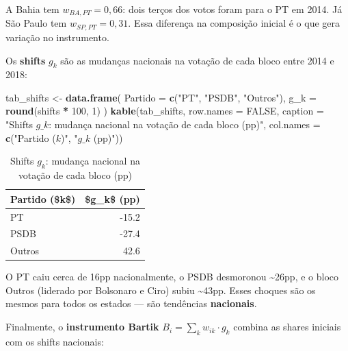 \documentclass[
]{article}
\newenvironment{Shaded}{\begin{snugshade}}{\end{snugshade}}
\newcommand{\AttributeTok}[1]{\textcolor[rgb]{0.13,0.29,0.53}{#1}}
\newcommand{\ConstantTok}[1]{\textcolor[rgb]{0.56,0.35,0.01}{#1}}
\newcommand{\DecValTok}[1]{\textcolor[rgb]{0.00,0.00,0.81}{#1}}
\newcommand{\FunctionTok}[1]{\textcolor[rgb]{0.13,0.29,0.53}{\textbf{#1}}}
\newcommand{\NormalTok}[1]{#1}
\newcommand{\OtherTok}[1]{\textcolor[rgb]{0.56,0.35,0.01}{#1}}
\newcommand{\SpecialCharTok}[1]{\textcolor[rgb]{0.81,0.36,0.00}{\textbf{#1}}}
\newcommand{\StringTok}[1]{\textcolor[rgb]{0.31,0.60,0.02}{#1}}
\begin{document}
A Bahia tem \(w_{BA,PT} = 0{,}66\): dois terços dos votos foram para o PT em 2014. Já São Paulo tem \(w_{SP,PT} = 0{,}31\). Essa diferença na composição inicial é o que gera variação no instrumento.

Os \textbf{shifts} \(g_k\) são as mudanças nacionais na votação de cada bloco entre 2014 e 2018:

\begin{Shaded}
\begin{Highlighting}[]
\NormalTok{tab\_shifts }\OtherTok{\textless{}{-}} \FunctionTok{data.frame}\NormalTok{(}
  \AttributeTok{Partido =} \FunctionTok{c}\NormalTok{(}\StringTok{"PT"}\NormalTok{, }\StringTok{"PSDB"}\NormalTok{, }\StringTok{"Outros"}\NormalTok{),}
  \AttributeTok{g\_k =} \FunctionTok{round}\NormalTok{(shifts }\SpecialCharTok{*} \DecValTok{100}\NormalTok{, }\DecValTok{1}\NormalTok{)}
\NormalTok{)}
\FunctionTok{kable}\NormalTok{(tab\_shifts, }\AttributeTok{row.names =} \ConstantTok{FALSE}\NormalTok{,}
      \AttributeTok{caption =} \StringTok{"Shifts $g\_k$: mudança nacional na votação de cada bloco (pp)"}\NormalTok{,}
      \AttributeTok{col.names =} \FunctionTok{c}\NormalTok{(}\StringTok{"Partido ($k$)"}\NormalTok{, }\StringTok{"$g\_k$ (pp)"}\NormalTok{))}
\end{Highlighting}
\end{Shaded}

\begin{table}

\caption{\label{tab:ss-iv-shifts}Shifts $g_k$: mudança nacional na votação de cada bloco (pp)}
\centering
\begin{tabular}[t]{l|r}
\hline
Partido (\$k\$) & \$g\_k\$ (pp)\\
\hline
PT & -15.2\\
\hline
PSDB & -27.4\\
\hline
Outros & 42.6\\
\hline
\end{tabular}
\end{table}

O PT caiu cerca de 16pp nacionalmente, o PSDB desmoronou \textasciitilde26pp, e o bloco Outros (liderado por Bolsonaro e Ciro) subiu \textasciitilde43pp. Esses choques são os mesmos para todos os estados --- são tendências \textbf{nacionais}.

Finalmente, o \textbf{instrumento Bartik} \(B_i = \sum_k w_{ik} \cdot g_k\) combina as shares iniciais com os shifts nacionais:
\end{document}

